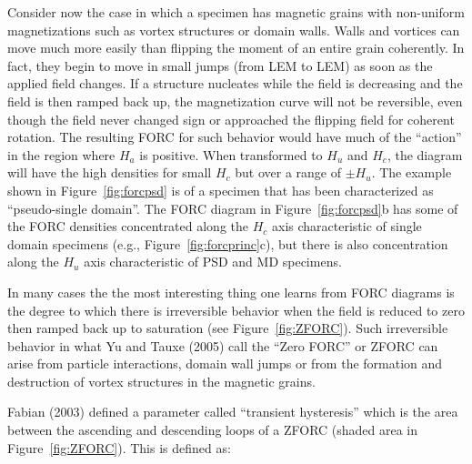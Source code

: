  Consider  now the case in which a specimen has magnetic grains with non-uniform magnetizations such as vortex structures or domain walls.   Walls and vortices can move much more easily than flipping the moment of an entire grain coherently.  In fact,  they begin to move in small jumps (from LEM to LEM) as soon as the applied field changes.  If a structure nucleates while the field is decreasing and  the field is then ramped back up, the magnetization curve will not be reversible, even though the field never changed sign or approached the flipping field for coherent rotation.   The resulting FORC for such behavior would have much of the ``action'' in the region where $H_a$ is  positive.   When transformed to $H_u$ and $H_c$, the diagram will have the high densities for small $H_c$ but over a range of  $\pm H_u$.  The example shown in   Figure~\ref{fig:forcpsd} is of a specimen that has been characterized as ``pseudo-single domain''.  The FORC diagram in Figure~\ref{fig:forcpsd}b has some of the FORC densities concentrated along the $H_c$ axis characteristic  of single domain specimens (e.g., Figure~\ref{fig:forcprinc}c), but there is also concentration along the $H_u$ axis characteristic of PSD and MD specimens.       
 



  In many cases the the most interesting thing one learns from FORC diagrams is the degree to which there is irreversible behavior  when the field is reduced to zero then ramped back up to saturation (see Figure~\ref{fig:ZFORC}).  Such irreversible behavior in what 
  \nocite{yu05b} 
  Yu and Tauxe (2005) call the ``Zero FORC'' or ZFORC  can arise from particle interactions, domain wall jumps or from the formation and destruction of vortex structures in the magnetic grains.   

\nocite{fabian03} 
Fabian (2003) defined a parameter called ``transient hysteresis''  which is the area between the ascending and descending loops of a ZFORC (shaded area in Figure~\ref{fig:ZFORC}).    This is defined as:

